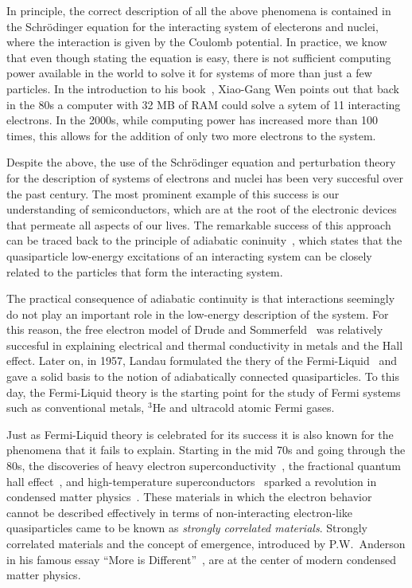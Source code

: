 \documentclass[oneside,11pt]{memoir}
\begin{document}
In principle,  the correct description of all the above phenomena is contained
in the Schr\"{o}dinger equation for the interacting system of electerons and
nuclei,  where the interaction is given by the Coulomb potential. In practice,
we know that even though stating the equation is easy, there is not sufficient
computing power available in the world to solve it for systems of more than
just a few particles.  In the introduction to his book~\cite{wen2004quantum},
Xiao-Gang Wen points out that back in the 80s a computer with 32 MB of RAM
could solve a sytem of 11 interacting electrons.  In the 2000s, while computing
power has increased more than 100 times, this allows for the addition of only
two more electrons to the system.  

Despite the above,  the use of the Schr\"{o}dinger equation and perturbation
theory for the description of  systems of electrons and nuclei has been very
succesful over the past century.  The most prominent example of this success is
our understanding of semiconductors, which are at the root of the electronic
devices that permeate all aspects of our lives.  The remarkable success of this
approach can be traced back to the principle of adiabatic
coninuity~\cite{altland2010condensed}, which states that the quasiparticle
low-energy excitations of an interacting system can be closely related to the
particles that form the interacting system.  

The practical consequence of adiabatic continuity is that interactions
seemingly do not play an important role in the low-energy description of the
system.  For this reason, the free electron model of Drude and
Sommerfeld~\cite{ashcroft1976solid} was relatively succesful in explaining
electrical and thermal conductivity in metals and the Hall effect.   Later on,
in 1957, Landau formulated the thery of the
Fermi-Liquid~\cite{landau1965collected} and gave a solid basis to the notion of
adiabatically connected quasiparticles.  To this day, the Fermi-Liquid theory
is the starting point for the study of Fermi systems such as conventional
metals, $^{3}$He and ultracold atomic Fermi gases.

Just as Fermi-Liquid theory is celebrated for its success it is also known for
the phenomena that it fails to explain.   Starting in the mid 70s and going
through the 80s, the discoveries of heavy electron
superconductivity~\cite{PhysRevLett.35.1779,PhysRevLett.43.1892},  the
fractional quantum hall effect~\cite{PhysRevLett.48.1559,PhysRevLett.50.1395},
and high-temperature superconductors~\cite{Zeitschrift.64.189} sparked a
revolution in condensed matter physics~\cite{coleman2004revolution}.   These
materials in which the electron behavior cannot be described effectively in
terms of non-interacting electron-like quasiparticles came to be known as
\textit{strongly correlated materials}.   Strongly correlated  materials and
the concept of emergence, introduced by P.W.~Anderson in his famous essay
``More is Different''~\cite{Anderson1972}, are at the center of modern
condensed matter physics. 
\end{document}
